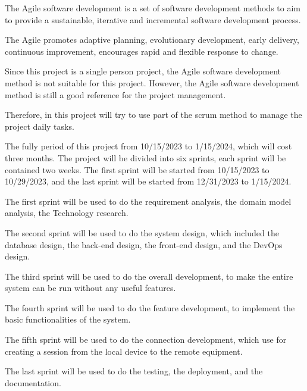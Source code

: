 The Agile software development is a set of software development methods
to aim to provide a sustainable, iterative and incremental software development
process.

The Agile promotes adaptive planning, evolutionary development, early delivery,
continuous improvement, encourages rapid and flexible response to change.

Since this project is a single person project, the Agile software development
method is not suitable for this project. However, the Agile software development
method is still a good reference for the project management.

Therefore, in this project will try to use part of the scrum method to manage
the project daily tasks.

The fully period of this project from 10/15/2023 to 1/15/2024, which will cost 
three months. The project will be divided into six sprints, each sprint will
be contained two weeks. The first sprint will be started 
from 10/15/2023 to 10/29/2023,
and the last sprint will be started from 12/31/2023 to 1/15/2024. 

The first sprint will be used to do the requirement analysis, the domain model
analysis, the Technology research.

The second sprint will be used to do the system design, which included the 
database design, the back-end design, the front-end design, and the DevOps 
design.

The third sprint will be used to do the overall development, to make the entire
system can be run without any useful features.

The fourth sprint will be used to do the feature development, to implement the
basic functionalities of the system.

The fifth sprint will be used to do the connection development, which use for 
creating a session from the local device to the remote equipment.

The last sprint will be used to do the testing, the deployment, and the
documentation.